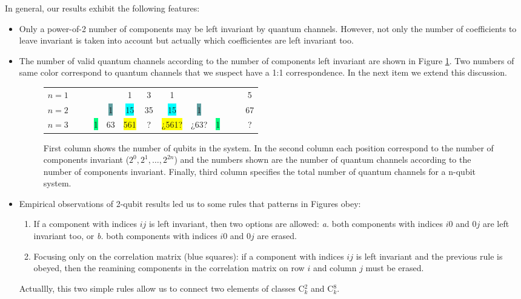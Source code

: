 \documentclass[11pt,dvipsnames]{article}
\begin{document}
In general, our results exhibit the following features:
\begin{itemize}
\item Only a power-of-2 number of components may be left invariant by 
			quantum channels. However,
			not only the number of 
			coefficients to leave invariant is taken into account but actually
			which coefficientes are left invariant too.

\item 
The number of valid quantum channels according to the number of components
left invariant are shown in Figure \ref{fig:CCs-by-components}. Two numbers
of same color correspond to quantum channels that we suspect have a 1:1 
correspondence. In the next item we extend this discussion.

\begin{figure}[H]
	\centering
		\begin{tabular}{>{$n=}l<{$\hfill}*{12}{c}}
			1 &&&&&\colorbox{Apricot}{1}&3&\colorbox{Apricot}{1}&&&&&5\\
			2 &&&&\colorbox{CadetBlue}{1}&\colorbox{Cyan}{15}&35&\colorbox{Cyan}{15}&\colorbox{CadetBlue}{1}&&&&67\\
			3 &&&\colorbox{SpringGreen}{1}&\colorbox{RedOrange}{63}&\colorbox{Yellow}{561}&?&\colorbox{Yellow}{¿561?}&
				\colorbox{RedOrange}{¿63?}&\colorbox{SpringGreen}{1}&&&?
			\end{tabular}
			\caption{First column shows the number of qubits in the system. 
							In the second column each position correspond to the 
							number of components invariant ($2^0, 2^1, \ldots, 2^{2n}$) and
							the numbers shown are the number of quantum channels according to 
							the number of components invariant.
							Finally, third column specifies the total number of quantum 
							channels for a n-qubit system.}
			\label{fig:CCs-by-components}
\end{figure}

\item Empirical observations of 2-qubit results led us to some rules that 
			patterns in Figures obey:
			\begin{enumerate}
				\item If a component with indices $ij$ is left invariant, then two 
							options are allowed: \textit{a.} both components with indices $i0$ 
							and $0j$ are left invariant too, or \textit{b.} both
							components with indices $i0$ and $0j$ are erased.
				\item Focusing only on the correlation matrix (blue squares): if a 
							component	with indices $ij$ is left invariant and the previous 
							rule is obeyed, then the reamining components in the correlation 
							matrix on row $i$ and column $j$ must be erased.
			\end{enumerate}	Actuallly, this two simple rules allow us to connect
			two elements of classes C${}^2_k$ and C${}^8_k$.


\end{itemize}
\end{document}

